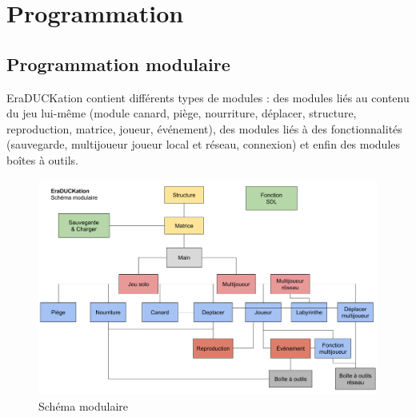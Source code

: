 \documentclass[12pt,a4paper,twoside]{article}
\begin{document}
\section{Programmation}
\subsection{Programmation modulaire}
EraDUCKation contient différents types de modules : des modules liés au contenu du jeu lui-même (module canard, piège, nourriture, déplacer, structure, reproduction, matrice, joueur, événement), des modules liés à des fonctionnalités (sauvegarde, multijoueur joueur local et réseau, connexion) et enfin des modules boîtes à outils.
\begin{figure}[h]
\centering
\includegraphics[width=1\textwidth]{module.png}
\caption{Schéma modulaire}
\end{figure}
\end{document}
